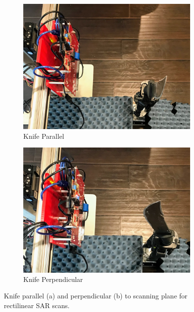\documentclass[conference]{IEEEtran}
\begin{document}
		\begin{figure} [h]
			\begin{subfigure}{.5\linewidth}
				\centering
				\includegraphics[width=1\linewidth]{../Figures/Scanner Parallel}
				\caption{Knife Parallel}
				\label{fig:scanner_parallel}
			\end{subfigure}%
			\begin{subfigure}{.5\linewidth}
				\centering
				\includegraphics[width=1\linewidth]{../Figures/Scanner Perp}
				\caption{Knife Perpendicular}
				\label{fig:scanner_perp}
			\end{subfigure}
			\caption{Knife parallel (a) and perpendicular (b) to scanning plane for rectilinear SAR scans.}
			\label{fig:MIMO_SAR_System_Configuration}
		\end{figure}
		
\end{document}
